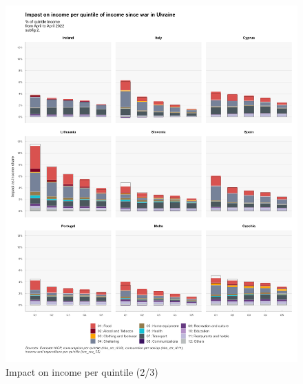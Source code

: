 \documentclass[
  9pt,
  a4paper,
  DIV=11,
  numbers=noendperiod]{scrartcl}
\begin{document}
\begin{figure}

\caption{Impact on income per quintile (2/3)}

{\centering \includegraphics[width=17cm,height=\textheight]{../svg/coicop_l1_1y_2.png}

}

\end{figure}
\end{document}
